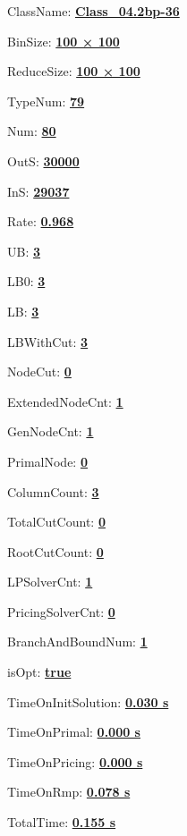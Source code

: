 \documentclass[11pt]{article}
\begin{document}
\pagestyle{empty}


ClassName: \underline{\textbf{Class_04.2bp-36}}
\par
BinSize: \underline{\textbf{100 × 100}}
\par
ReduceSize: \underline{\textbf{100 × 100}}
\par
TypeNum: \underline{\textbf{79}}
\par
Num: \underline{\textbf{80}}
\par
OutS: \underline{\textbf{30000}}
\par
InS: \underline{\textbf{29037}}
\par
Rate: \underline{\textbf{0.968}}
\par
UB: \underline{\textbf{3}}
\par
LB0: \underline{\textbf{3}}
\par
LB: \underline{\textbf{3}}
\par
LBWithCut: \underline{\textbf{3}}
\par
NodeCut: \underline{\textbf{0}}
\par
ExtendedNodeCnt: \underline{\textbf{1}}
\par
GenNodeCnt: \underline{\textbf{1}}
\par
PrimalNode: \underline{\textbf{0}}
\par
ColumnCount: \underline{\textbf{3}}
\par
TotalCutCount: \underline{\textbf{0}}
\par
RootCutCount: \underline{\textbf{0}}
\par
LPSolverCnt: \underline{\textbf{1}}
\par
PricingSolverCnt: \underline{\textbf{0}}
\par
BranchAndBoundNum: \underline{\textbf{1}}
\par
isOpt: \underline{\textbf{true}}
\par
TimeOnInitSolution: \underline{\textbf{0.030 s}}
\par
TimeOnPrimal: \underline{\textbf{0.000 s}}
\par
TimeOnPricing: \underline{\textbf{0.000 s}}
\par
TimeOnRmp: \underline{\textbf{0.078 s}}
\par
TotalTime: \underline{\textbf{0.155 s}}
\par
\newpage
\end{document}
